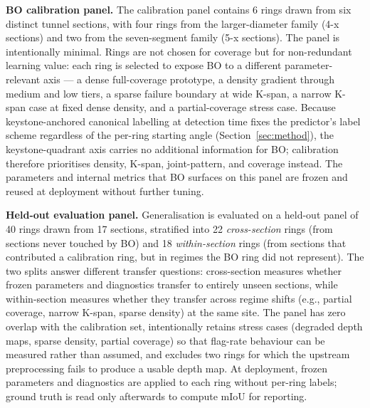 \documentclass[a4paper,fleqn]{cas-dc}
\begin{document}
\textbf{BO calibration panel.} The calibration panel contains 6 rings drawn from six distinct tunnel sections, with four rings from the larger-diameter family (4-x sections) and two from the seven-segment family (5-x sections). The panel is intentionally minimal. Rings are not chosen for coverage but for non-redundant learning value: each ring is selected to expose BO to a different parameter-relevant axis --- a dense full-coverage prototype, a density gradient through medium and low tiers, a sparse failure boundary at wide K-span, a narrow K-span case at fixed dense density, and a partial-coverage stress case. Because keystone-anchored canonical labelling at detection time fixes the predictor's label scheme regardless of the per-ring starting angle (Section~\ref{sec:method}), the keystone-quadrant axis carries no additional information for BO; calibration therefore prioritises density, K-span, joint-pattern, and coverage instead. The parameters and internal metrics that BO surfaces on this panel are frozen and reused at deployment without further tuning.

\textbf{Held-out evaluation panel.} Generalisation is evaluated on a held-out panel of 40 rings drawn from 17 sections, stratified into 22 \emph{cross-section} rings (from sections never touched by BO) and 18 \emph{within-section} rings (from sections that contributed a calibration ring, but in regimes the BO ring did not represent). The two splits answer different transfer questions: cross-section measures whether frozen parameters and diagnostics transfer to entirely unseen sections, while within-section measures whether they transfer across regime shifts (e.g., partial coverage, narrow K-span, sparse density) at the same site. The panel has zero overlap with the calibration set, intentionally retains stress cases (degraded depth maps, sparse density, partial coverage) so that flag-rate behaviour can be measured rather than assumed, and excludes two rings for which the upstream preprocessing fails to produce a usable depth map. At deployment, frozen parameters and diagnostics are applied to each ring without per-ring labels; ground truth is read only afterwards to compute mIoU for reporting.
\end{document}
